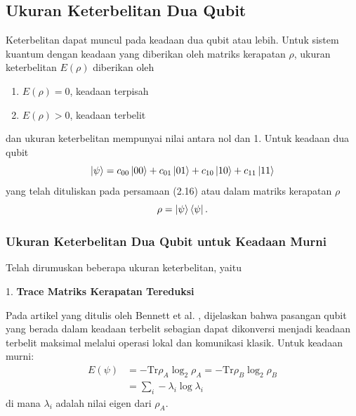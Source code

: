 \subsection{Ukuran Keterbelitan Dua Qubit}
\par
Keterbelitan dapat muncul pada keadaan dua qubit atau lebih. Untuk sistem kuantum dengan keadaan yang diberikan oleh matriks kerapatan $\rho$, ukuran keterbelitan $E(\rho)$ diberikan oleh
\begin{enumerate}
	\item $E(\rho)=0$, keadaan terpisah
	\item $E(\rho)>0$, keadaan terbelit
\end{enumerate}
dan ukuran keterbelitan mempunyai nilai antara nol dan 1. Untuk keadaan dua qubit
\begin{equation*}
	\ket{\psi}=c_{00}\ket{00}+c_{01}\ket{01}+c_{10}\ket{10}+c_{11}\ket{11}
\end{equation*}
yang telah dituliskan pada persamaan (2.16) atau dalam matriks kerapatan $\rho$
\begin{equation*}
	\rho=\ket{\psi}\bra{\psi}.
\end{equation*}

\subsubsection{Ukuran Keterbelitan Dua Qubit untuk Keadaan Murni}
Telah dirumuskan beberapa ukuran keterbelitan, yaitu

1. \textbf{Trace Matriks Kerapatan Tereduksi}
\par
Pada artikel yang ditulis oleh Bennett et al. \cite{Bennett1996}, dijelaskan bahwa pasangan qubit yang berada dalam keadaan terbelit sebagian dapat dikonversi menjadi keadaan terbelit maksimal melalui operasi lokal dan komunikasi klasik. Untuk keadaan murni:
\begin{equation}
	\begin{aligned}
		E(\psi)
		&=-\mathrm{Tr}\rho_{A}\log_2\rho_{A}=-\mathrm{Tr}\rho_{B}\log_2\rho_{B}\\
		&=\sum_{i}-\lambda_i\log\lambda_i
	\end{aligned}
\end{equation}
di mana $\lambda_i$ adalah nilai eigen dari $\rho_{A}$.

